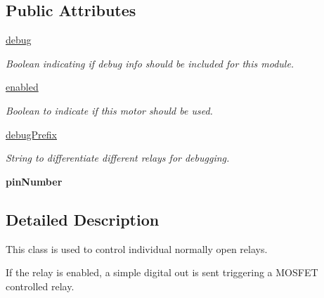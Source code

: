 \subsection*{Public Attributes}
\begin{DoxyCompactItemize}
\item 
\mbox{\label{classmcs_1_1firmware_1_1RelayControl_1_1RelayControl_ab11103706eb6f9296650ed241f2acba6}} 
\hyperlink{classmcs_1_1firmware_1_1RelayControl_1_1RelayControl_ab11103706eb6f9296650ed241f2acba6}{debug}
\begin{DoxyCompactList}\small\item\em Boolean indicating if debug info should be included for this module. \end{DoxyCompactList}\item 
\hyperlink{classmcs_1_1firmware_1_1RelayControl_1_1RelayControl_a9ae2c738456b71efdc1bb687daa69f83}{enabled}
\begin{DoxyCompactList}\small\item\em Boolean to indicate if this motor should be used. \end{DoxyCompactList}\item 
\mbox{\label{classmcs_1_1firmware_1_1RelayControl_1_1RelayControl_a58fe9f8bf4076973fed73b42b34d5cae}} 
\hyperlink{classmcs_1_1firmware_1_1RelayControl_1_1RelayControl_a58fe9f8bf4076973fed73b42b34d5cae}{debug\+Prefix}
\begin{DoxyCompactList}\small\item\em String to differentiate different relays for debugging. \end{DoxyCompactList}\item 
\mbox{\label{classmcs_1_1firmware_1_1RelayControl_1_1RelayControl_a44ad6ffce67e2095fc4c74d2af66be8f}} 
{\bfseries pin\+Number}
\end{DoxyCompactItemize}


\subsection{Detailed Description}
This class is used to control individual normally open relays. 

If the relay is enabled, a simple digital out is sent triggering a M\+O\+S\+F\+ET controlled relay. 

